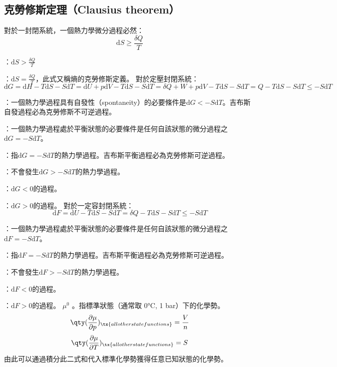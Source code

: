 \documentclass[a4paper,12pt]{report}
\begin{document}
\subsection{克勞修斯定理（Clausius theorem）}
對於一封閉系統，一個熱力學微分過程必然：
\[\mathrm{d}S \geq \frac{\delta Q}{T}\]
\bit
\item {}：$\mathrm{d}S > \frac{\delta Q}{T}$
\item {}：$\mathrm{d}S = \frac{\delta Q}{T}$，此式又稱熵的克勞修斯定義。
\eit
{}
對於定壓封閉系統：
\[\mathrm{d} G = \mathrm{d} H - T \mathrm{d} S - S\mathrm{d} T = \mathrm{d} U + p\mathrm{d} V - T \mathrm{d} S - S\mathrm{d} T = \delta Q + W + p\mathrm{d} V - T \mathrm{d} S - S\mathrm{d} T = Q - T \mathrm{d} S - S\mathrm{d} T \leq - S\mathrm{d} T\]
\bit
\item {}：一個熱力學過程具有自發性（spontaneity）的必要條件是$\mathrm{d} G < - S\mathrm{d} T$。吉布斯自發過程必為克勞修斯不可逆過程。
\item {}：一個熱力學過程處於平衡狀態的必要條件是任何自該狀態的微分過程之$\mathrm{d} G = - S\mathrm{d} T$。
\item {}：指$\mathrm{d} G = - S\mathrm{d} T$的熱力學過程。吉布斯平衡過程必為克勞修斯可逆過程。
\item {}：不會發生$\mathrm{d} G > - S\mathrm{d} T$的熱力學過程。
\item {}：$\mathrm{d}G<0$的過程。
\item {}：$\mathrm{d}G>0$的過程。
\eit
{}
對於一定容封閉系統：
\[\mathrm{d} F = \mathrm{d} U - T \mathrm{d} S - S\mathrm{d} T = \delta Q - T \mathrm{d} S - S\mathrm{d} T\leq - S\mathrm{d} T\]
\bit
\item {}：一個熱力學過程處於平衡狀態的必要條件是任何自該狀態的微分過程之$\mathrm{d} F  = - S\mathrm{d} T$。
\item {}：指$\mathrm{d} F = - S\mathrm{d} T$的熱力學過程。吉布斯平衡過程必為克勞修斯可逆過程。
\item {}：不會發生$\mathrm{d} F > - S\mathrm{d} T$的熱力學過程。
\item {}：$\mathrm{d}F<0$的過程。
\item {}：$\mathrm{d}F>0$的過程。
\eit
{}
\(\mu^0\) 。指標準狀態（通常取 0°C, 1 bar）下的化學勢。
\[\qty(\frac{\partial\mu}{\partial p})_{\tx{all other state functions}}=\frac{V}{n}\]
\[\qty(\frac{\partial\mu}{\partial T})_{\tx{all other state functions}}=S\]
由此可以通過積分此二式和代入標準化學勢獲得任意已知狀態的化學勢。
\end{document}
